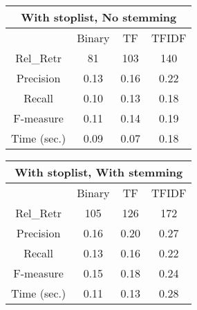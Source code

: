 \documentclass[12pt, a4paper]{article}
\begin{document}
\begin{multicols}{2}
  \def\arraystretch{1.3}
  \begin{table}[H]
    \begin{tabular}{|c||c||c||c|}
    \hline
    \multicolumn{4}{|c|}{\textbf{With} stoplist, \textbf{No} stemming} \\ \hline
                & Binary & TF   & TFIDF \\ \hline
    Rel\_Retr   & 81     & 103  & 140   \\ \hline
    Precision   & 0.13   & 0.16 & 0.22  \\ \hline
    Recall      & 0.10   & 0.13 & 0.18  \\ \hline
    F-measure   & 0.11   & 0.14 & 0.19  \\ \hline\hline
    Time (sec.) & 0.09   & 0.07 & 0.18  \\ \hline
    \end{tabular}
  \end{table}

  \columnbreak

  \begin{table}[H]
    \begin{tabular}{|c||c||c||c|}
    \hline
    \multicolumn{4}{|c|}{\textbf{With} stoplist, \textbf{With} stemming} \\ \hline
                & Binary & TF   & TFIDF \\ \hline
    Rel\_Retr   & 105    & 126  & 172   \\ \hline
    Precision   & 0.16   & 0.20 & 0.27  \\ \hline
    Recall      & 0.13   & 0.16 & 0.22  \\ \hline
    F-measure   & 0.15   & 0.18 & 0.24  \\ \hline\hline
    Time (sec.) & 0.11   & 0.13 & 0.28  \\ \hline
    \end{tabular}
  \end{table}
\end{multicols}

\begin{center}
  \label{table:results}
\end{center}
\end{document}
